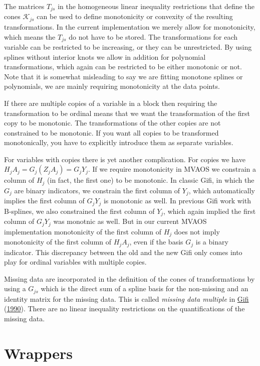 \documentclass[
  12pt,
]{book}
\begin{document}
The matrices \(T_{js}\) in the homogeneous linear inequality restrictions that define the cones \(\mathcal{K}_{js}\) can be used to define monotonicity or convexity of the resulting transformations. In the current implementation we merely allow for monotonicity, which means the \(T_{js}\) do not have to be stored. The transformations for each variable can be restricted to be increasing, or they can be unrestricted. By using splines without interior knots we allow in addition for polynomial transformations, which again can be restricted to be either monotonic or not. Note that it is somewhat misleading to say we are fitting monotone splines or polynomials, we are mainly requiring monotonicity at the data points.

If there are multiple copies of a variable in a block then requiring the transformation to be ordinal means that we want the transformation of the first copy to be monotonic. The transformations of the other copies are not constrained to be monotonic. If you want all copies to
be transformed monotonically, you have to explicitly introduce them as separate variables.

For variables with copies there is yet another complication. For copies we have \(H_jA_j=G_j(Z_jA_j)=G_jY_j\). If we require monotonicity in MVAOS we constrain a column of \(H_j\) (in fact, the first one) to be monotonic. In classic Gifi, in which the \(G_j\) are binary indicators, we constrain the first column of \(Y_j\), which automatically implies the first column of \(G_jY_j\) is monotonic as well. In previous Gifi work with B-splines, we also constrained the first column of \(Y_j\), which again implied the first column of \(G_jY_j\) was monotnic as well. But in our current MVAOS implementation monotonicity of the first column of \(H_j\) does not imply monotonicity of the first column of \(H_jA_j\),
even if the basis \(G_j\) is a binary indicator. This discrepancy between the old and the new Gifi only comes into play for ordinal variables with multiple copies.

Missing data are incorporated in the definition of the cones of transformations by using a \(G_{js}\) which is the direct sum of a spline basis for the non-missing and an identity matrix for the missing data. This is called \emph{missing data multiple} in \protect\hyperlink{ref-gifi_B_90}{Gifi} (\protect\hyperlink{ref-gifi_B_90}{1990}). There are no linear inequality restrictions on the quantifications of the missing data.

\hypertarget{wrappers}{%
\section{Wrappers}\label{wrappers}}
\end{document}
